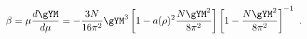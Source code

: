 \begin{equation}
\label{beta}
 \beta = \mu \frac{d\gYM}{d\mu} 
  = -\frac{3N}{16\pi^2} \gYM^3 
  \left[ 1-a(\rho)^2\frac{N\gYM^2}{8\pi^2} \right]
  \left[1-\frac{N\gYM^2}{8\pi^2} \right]^{-1}~.
\end{equation}

